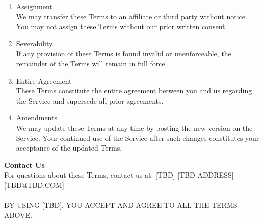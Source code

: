 \documentclass{standalone}
\begin{document}
\begin{enumerate}[label=\arabic*., noitemsep,leftmargin=*]
\begin{enumerate}[label*=\arabic*., noitemsep,leftmargin=*]
			\item Assignment\\
			We may transfer these Terms to an affiliate or third party without notice. You may not assign these Terms without our prior written consent.
			\item Severability\\
			If any provision of these Terms is found invalid or unenforceable, the remainder of the Terms will remain in full force.
			\item Entire Agreement\\
			These Terms constitute the entire agreement between you and us regarding the Service and supersede all prior agreements.
			\item Amendments\\
			We may update these Terms at any time by posting the new version on the Service. Your continued use of the Service after such changes constitutes your acceptance of the updated Terms.
		\end{enumerate}
	\end{enumerate}
	
	\textbf{Contact Us}\\
	For questions about these Terms, contact us at: [TBD] [TBD ADDRESS] [TBD@TBD.COM]\\ \\
	BY USING [TBD], YOU ACCEPT AND AGREE TO ALL THE TERMS ABOVE.
\end{document}
